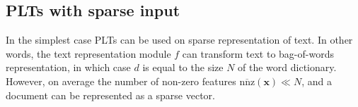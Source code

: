 \documentclass{article}
\newcommand{\Algo}[1]{\textsc{#1}}
\renewcommand{\vec}[1]{\boldsymbol{#1}}
\newcommand{\bx}{\vec{x}}
\newcommand{\by}{\vec{y}}
\newcommand{\heta}{\hat{\eta}}
\newcommand{\Path}[1]{\mathrm{Path}(#1)}
\newcommand{\sectionBefore}{-0pt}
\newcommand{\sectionAfter}{-0pt}
\begin{document}
%
%
%	
%

\vspace{\sectionBefore}
\subsection{PLTs with sparse input}
\label{sec:plt-sparse}
\vspace{\sectionAfter}

In the simplest case PLTs can be used on sparse representation of text. In other words, the text representation module $f$ can transform text to bag-of-words representation, in which case $d$ is equal to the size $N$ of the word dictionary. However, on average the number of non-zero features $\overline{\mathrm{nnz}}(\bx) \ll N$, and a document can be represented as a sparse vector. 
\end{document}
